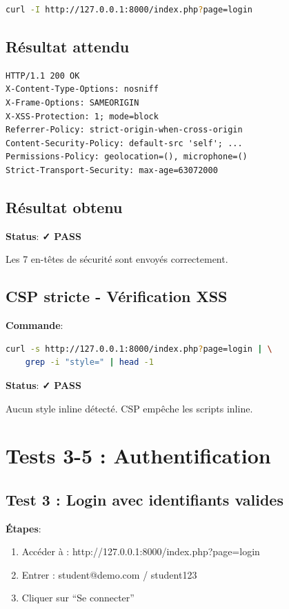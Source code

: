 \documentclass[11pt,a4paper,french]{report}
\newcommand{\pass}{\cellcolor{pass}\textbf{\color{white}✓ PASS}}
\begin{document}
\begin{lstlisting}[language=bash]
curl -I http://127.0.0.1:8000/index.php?page=login
\end{lstlisting}

\subsection{Résultat attendu}

\begin{lstlisting}
HTTP/1.1 200 OK
X-Content-Type-Options: nosniff
X-Frame-Options: SAMEORIGIN
X-XSS-Protection: 1; mode=block
Referrer-Policy: strict-origin-when-cross-origin
Content-Security-Policy: default-src 'self'; ...
Permissions-Policy: geolocation=(), microphone=()
Strict-Transport-Security: max-age=63072000
\end{lstlisting}

\subsection{Résultat obtenu}

\textbf{Status}: \pass

Les 7 en-têtes de sécurité sont envoyés correctement.

\subsection{CSP stricte - Vérification XSS}

\textbf{Commande}:
\begin{lstlisting}[language=bash]
curl -s http://127.0.0.1:8000/index.php?page=login | \
    grep -i "style=" | head -1
\end{lstlisting}

\textbf{Status}: \pass

Aucun style inline détecté. CSP empêche les scripts inline.

\newpage

\section{Tests 3-5 : Authentification}

\subsection{Test 3 : Login avec identifiants valides}

\textbf{Étapes}:
\begin{enumerate}
    \item Accéder à : http://127.0.0.1:8000/index.php?page=login
    \item Entrer : student@demo.com / student123
    \item Cliquer sur ``Se connecter''
\end{enumerate}
\end{document}
